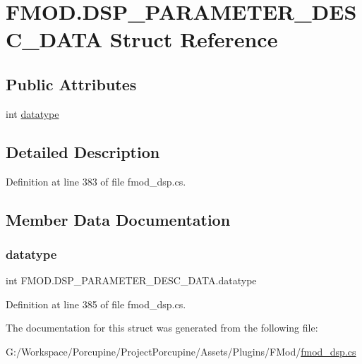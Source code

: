 \hypertarget{struct_f_m_o_d_1_1_d_s_p___p_a_r_a_m_e_t_e_r___d_e_s_c___d_a_t_a}{}\section{F\+M\+O\+D.\+D\+S\+P\+\_\+\+P\+A\+R\+A\+M\+E\+T\+E\+R\+\_\+\+D\+E\+S\+C\+\_\+\+D\+A\+TA Struct Reference}
\label{struct_f_m_o_d_1_1_d_s_p___p_a_r_a_m_e_t_e_r___d_e_s_c___d_a_t_a}
\subsection*{Public Attributes}
\begin{DoxyCompactItemize}
\item 
int \hyperlink{struct_f_m_o_d_1_1_d_s_p___p_a_r_a_m_e_t_e_r___d_e_s_c___d_a_t_a_a3a9251bc3cc9c22cf4d405baabad786e}{datatype}
\end{DoxyCompactItemize}


\subsection{Detailed Description}


Definition at line 383 of file fmod\+\_\+dsp.\+cs.



\subsection{Member Data Documentation}
\mbox{\label{struct_f_m_o_d_1_1_d_s_p___p_a_r_a_m_e_t_e_r___d_e_s_c___d_a_t_a_a3a9251bc3cc9c22cf4d405baabad786e}} 
\subsubsection{\texorpdfstring{datatype}{datatype}}
{\footnotesize\ttfamily int F\+M\+O\+D.\+D\+S\+P\+\_\+\+P\+A\+R\+A\+M\+E\+T\+E\+R\+\_\+\+D\+E\+S\+C\+\_\+\+D\+A\+T\+A.\+datatype}



Definition at line 385 of file fmod\+\_\+dsp.\+cs.



The documentation for this struct was generated from the following file\+:\begin{DoxyCompactItemize}
\item 
G\+:/\+Workspace/\+Porcupine/\+Project\+Porcupine/\+Assets/\+Plugins/\+F\+Mod/\hyperlink{fmod__dsp_8cs}{fmod\+\_\+dsp.\+cs}\end{DoxyCompactItemize}
